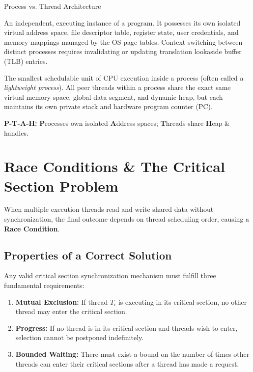 \documentclass[11pt,a4paper]{article}
\begin{document}
\begin{definitionbox}{Process vs. Thread Architecture}
\begin{description}[leftmargin=1.5em, itemsep=4pt]
    \item[\textbf{Process:}] An independent, executing instance of a program. It possesses its own isolated virtual address space, file descriptor table, register state, user credentials, and memory mappings managed by the OS page tables. Context switching between distinct processes requires invalidating or updating translation lookaside buffer (TLB) entries.
    \item[\textbf{Thread:}] The smallest schedulable unit of CPU execution inside a process (often called a \textit{lightweight process}). All peer threads within a process share the exact same virtual memory space, global data segment, and dynamic heap, but each maintains its own private stack and hardware program counter (PC).
\end{description}
\end{definitionbox}

\begin{mnemonicbox}
\textbf{P-T-A-H:} \textbf{P}rocesses own isolated \textbf{A}ddress spaces; \textbf{T}hreads share \textbf{H}eap \& handles.
\end{mnemonicbox}

\vspace{10pt}

\section{Race Conditions \& The Critical Section Problem}

When multiple execution threads read and write shared data without synchronization, the final outcome depends on thread scheduling order, causing a \textbf{Race Condition}.

\subsection{Properties of a Correct Solution}
Any valid critical section synchronization mechanism must fulfill three fundamental requirements:
\begin{enumerate}[leftmargin=1.5em, itemsep=2pt]
    \item \textbf{Mutual Exclusion:} If thread $T_i$ is executing in its critical section, no other thread may enter the critical section.
    \item \textbf{Progress:} If no thread is in its critical section and threads wish to enter, selection cannot be postponed indefinitely.
    \item \textbf{Bounded Waiting:} There must exist a bound on the number of times other threads can enter their critical sections after a thread has made a request.
\end{enumerate}
\end{document}
